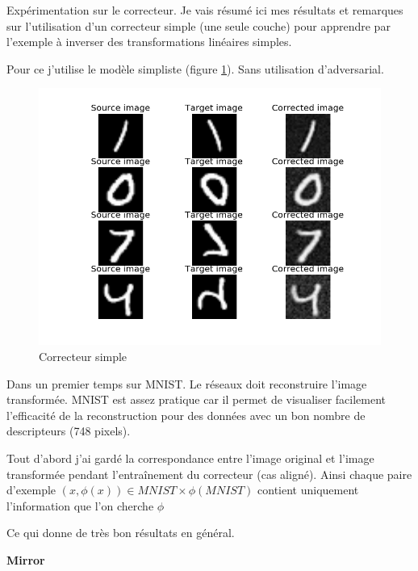 

Expérimentation sur le correcteur. Je vais résumé ici mes résultats et remarques
sur l'utilisation d'un correcteur simple (une seule couche) pour apprendre par l'exemple
à inverser des transformations linéaires simples.

Pour ce j'utilise le modèle simpliste (figure \ref{fig:correcteur}). 
Sans utilisation d'adversarial.

\begin{figure}[H] %
\centering
\includegraphics[width=0.45\linewidth]{fig/05-04-2016/MNISTMirror-PairWiseCorrector-lambda-0.0000-sample.png}
\caption{Correcteur simple}
\label{fig:correcteur}
\end{figure}



Dans un premier temps sur MNIST.
Le réseaux doit reconstruire l'image transformée.
MNIST est assez pratique car il permet de visualiser facilement l'efficacité 
de la reconstruction pour des données avec un bon nombre de descripteurs (748 pixels).


Tout d'abord j'ai gardé la correspondance entre l'image original et
l'image transformée pendant l'entraînement du correcteur (cas aligné).
Ainsi chaque paire d'exemple $(x, \phi(x)) \in MNIST\times \phi(MNIST)$
contient uniquement l'information que l'on cherche $\phi$

Ce qui donne de très bon résultats en général.


{\Large\bf Mirror}

